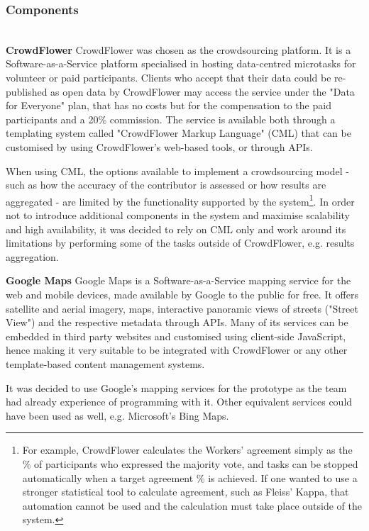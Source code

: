 \subsubsection{Components} \leavevmode \\ %

\textbf{CrowdFlower} CrowdFlower was chosen as the crowdsourcing platform. It is a Software-as-a-Service platform specialised in hosting data-centred microtasks for volunteer or paid participants. Clients who accept that their data could be re-published as open data by CrowdFlower may access the service under the "Data for Everyone" plan, that has no costs but for the compensation to the paid participants and a 20\% commission. The service is available both through a templating system called "CrowdFlower Markup Language" (CML) that can be customised by using CrowdFlower's web-based tools, or through APIs. 

When using CML, the options available to implement a crowdsourcing model - such as how the accuracy of the contributor is assessed or how results are aggregated - are limited by the functionality supported by the system\footnote{For example, CrowdFlower calculates the Workers' agreement simply as the \% of participants who expressed the majority vote, and tasks can be stopped automatically when a target agreement \% is achieved. If one wanted to use a stronger statistical tool to calculate agreement, such as Fleiss' Kappa, that automation cannot be used and the calculation must take place outside of the system.}. In order not to introduce additional components in the system and maximise scalability and high availability, it was decided to rely on CML only and work around its limitations by performing some of the tasks outside of CrowdFlower, e.g. results aggregation. 

\textbf{Google Maps} Google Maps is a Software-as-a-Service mapping service for the web and mobile devices, made available by Google to the public for free. It offers satellite and aerial imagery, maps, interactive panoramic views of streets ("Street View") and the respective metadata through APIs. Many of its services can be embedded in third party websites and customised using client-side JavaScript, hence making it very suitable to be integrated with CrowdFlower or any other template-based content management systems. 

It was decided to use Google's mapping services for the prototype as the team had already experience of programming with it. Other equivalent services could have been used as well, e.g. Microsoft's Bing Maps.

